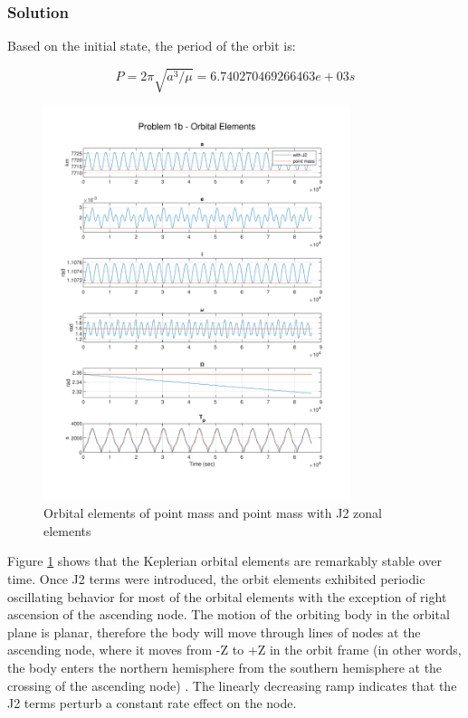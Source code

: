 \documentclass[conf]{new-aiaa}
\begin{document}

\subsubsection*{Solution} 

Based on the initial state, the period of the orbit is: 

\begin{equation}
	P = 2 \pi \sqrt{ a^3 / \mu } = 6.740270469266463e+03 s 
\end{equation}

\begin{figure}[H]
	\centering
	\includegraphics[width=0.8\textwidth]{Problem 1b - Orbital Elements.pdf}
	\caption{Orbital elements of point mass and point mass with J2 zonal elements} 
	\label{fig:prob_1b}	
\end{figure}

Figure \ref{fig:prob_1b} shows that the Keplerian orbital elements are remarkably stable over time. Once J2 terms were introduced, the orbit elements exhibited periodic oscillating behavior for most of the orbital elements with the exception of right ascension of the ascending node. The motion of the orbiting body in the orbital plane is planar, therefore the body will move through lines of nodes at the ascending node, where it moves from -Z to +Z in the orbit frame (in other words, the body enters the northern hemisphere from the southern hemisphere at the crossing of the ascending node) \cite{born_statorbitdet}. The linearly decreasing ramp indicates that the J2 terms perturb a constant rate effect on the node. 
\end{document}
